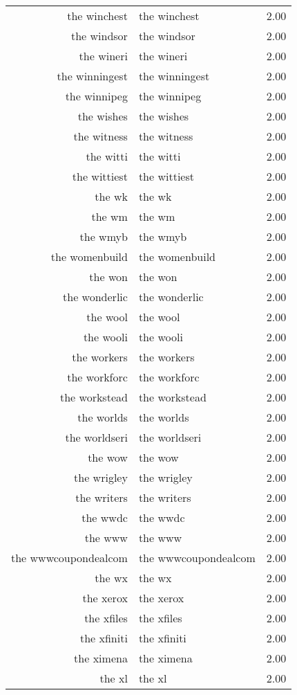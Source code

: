 \begin{table}[ht]
\begin{tabular}{rlr}
  the winchest & the winchest & 2.00 \\ 
  the windsor & the windsor & 2.00 \\ 
  the wineri & the wineri & 2.00 \\ 
  the winningest & the winningest & 2.00 \\ 
  the winnipeg & the winnipeg & 2.00 \\ 
  the wishes & the wishes & 2.00 \\ 
  the witness & the witness & 2.00 \\ 
  the witti & the witti & 2.00 \\ 
  the wittiest & the wittiest & 2.00 \\ 
  the wk & the wk & 2.00 \\ 
  the wm & the wm & 2.00 \\ 
  the wmyb & the wmyb & 2.00 \\ 
  the womenbuild & the womenbuild & 2.00 \\ 
  the won & the won & 2.00 \\ 
  the wonderlic & the wonderlic & 2.00 \\ 
  the wool & the wool & 2.00 \\ 
  the wooli & the wooli & 2.00 \\ 
  the workers & the workers & 2.00 \\ 
  the workforc & the workforc & 2.00 \\ 
  the workstead & the workstead & 2.00 \\ 
  the worlds & the worlds & 2.00 \\ 
  the worldseri & the worldseri & 2.00 \\ 
  the wow & the wow & 2.00 \\ 
  the wrigley & the wrigley & 2.00 \\ 
  the writers & the writers & 2.00 \\ 
  the wwdc & the wwdc & 2.00 \\ 
  the www & the www & 2.00 \\ 
  the wwwcoupondealcom & the wwwcoupondealcom & 2.00 \\ 
  the wx & the wx & 2.00 \\ 
  the xerox & the xerox & 2.00 \\ 
  the xfiles & the xfiles & 2.00 \\ 
  the xfiniti & the xfiniti & 2.00 \\ 
  the ximena & the ximena & 2.00 \\ 
  the xl & the xl & 2.00 \\ 

\end{tabular}
\end{table}

